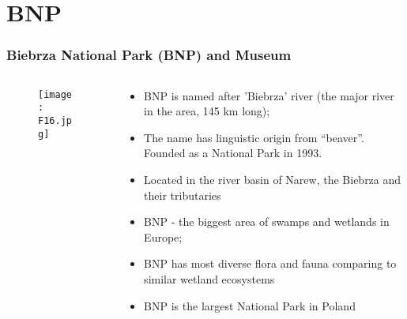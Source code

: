 \documentclass[pdflatex,compress,8pt,
	xcolor={dvipsnames,dvipsnames,svgnames,x11names,table},
	hyperref={colorlinks = true,
	breaklinks = true, urlcolor = NavyBlue, breaklinks = true}]{beamer}
\begin{document}
\section{BNP}
\begin{frame}\frametitle{Biebrza National Park (BNP) and Museum}
\begin{minipage}[0.4\textheight]{\textwidth}
\begin{columns}[T]
\begin{column}{0.4\textwidth}
\vspace{2em}
\begin{figure}[H]
	\centering
		\texttt{[image: F16.jpg]}
\end{figure}
\end{column}
\begin{column}{0.6\textwidth}
\vspace{2em} 
\begin{itemize}
            \item BNP is named after 'Biebrza' river (the major river in the area, 145 km long);
            \item The name has linguistic origin from “beaver”. Founded as a National Park in 1993.
            \item Located in the river basin of Narew, the Biebrza and their tributaries
            \item BNP - the  biggest area of swamps and wetlands in Europe;
            \item BNP has most diverse flora and fauna comparing to similar wetland ecosystems 
            \item BNP is the largest National Park in Poland
\end{itemize}
\end{column}
\end{columns}
\end{minipage}
\end{frame}
\end{document}

